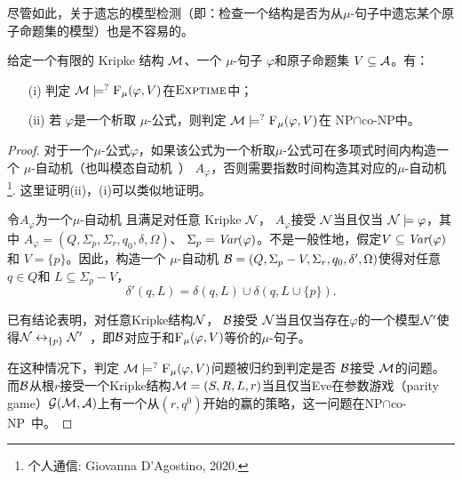 尽管如此，关于遗忘的模型检测（即：检查一个结构是否为从$\mu$-句子中遗忘某个原子命题集的模型）也是不容易的。
\begin{proposition}[模型检测]\label{chapter06:pro:MC}
	给定一个有限的 Kripke 结构  ${\cal M}$、一个 $\mu$-句子 $\varphi$和原子命题集 $V\subseteq {\cal A}$。有：
	\begin{itemize}
		\item[(i)] 判定 ${\cal M} \models^? {\textsc{F}_{\textsc{$\mu$}}}(\varphi, V)$在$\textsc{Exptime}$中；
		\item[(ii)] 若 $\varphi$是一个析取 $\mu$-公式，则判定 ${\cal M} \models^? {\textsc{F}_{\textsc{$\mu$}}}(\varphi, V)$在 \textsc{NP}$\cap$co-\textsc{NP}中。
	\end{itemize}
\end{proposition}
\begin{proof}
	对于一个$\mu$-公式$\varphi$，如果该公式为一个析取$\mu$-公式可在多项式时间内构造一个 $\mu$-自动机（也叫模态自动机~\cite{bradfield2018mu}） $A_{\varphi}$，否则需要指数时间构造其对应的$\mu$-自动机\footnote{个人通信: Giovanna D'Agostino, 2020.}.
	这里证明(ii)，(i)可以类似地证明。
	
	令$A_{\varphi}$为一个$\mu$-自动机 且满足对任意 Kripke ${\cal N}$， %
	$A_{\varphi}$接受 ${\cal N}$当且仅当 ${\cal N} \models \varphi$，其中 $A_{\varphi} = (Q, \Sigma_p, \Sigma_r, q_0, \delta, \Omega)$、 $\Sigma_p = \textit{Var}(\varphi)$。不是一般性地，假定$V \subseteq \textit{Var}(\varphi)$和 $V=\{p\}$。因此，构造一个 $\mu$-自动机 ${\cal B}= (Q, \Sigma_p - V, \Sigma_r, q_0, \delta', \Omega)$使得对任意$q\in Q$和 $L\subseteq \Sigma_p - V$，
	\[
	\delta'(q, L) = \delta(q, L) \cup \delta(q, L \cup \{p\}).
	\]
	
	已有结论表明，对任意Kripke结构${\cal N}$， ${\cal B}$接受 ${\cal N}$当且仅当存在$\varphi$的一个模型${\cal N}'$使得${\cal N} \leftrightarrow_{\{p\}} {\cal N}'$~\cite{d1996uniform}，即${\cal B}$对应于和${\textsc{F}_{\textsc{$\mu$}}}(\varphi, V)$等价的$\mu$-句子。
	
	
	在这种情况下，判定 ${\cal M} \models^? {\textsc{F}_{\textsc{$\mu$}}}(\varphi, V)$问题被归约到判定是否 ${\cal B}$接受 ${\cal M}$的问题。
	而${\cal B}$从根$r$接受一个Kripke结构${\cal M}=(S, R,L, r)$当且仅当Eve在参数游戏（parity game）${\cal G}({\cal M}, {\cal A})$上有一个从$(r,q^0)$开始的赢的策略，这一问题在\textsc{NP}$\cap$co-\textsc{NP}~\cite{bradfield2018mu}中。
\end{proof}

